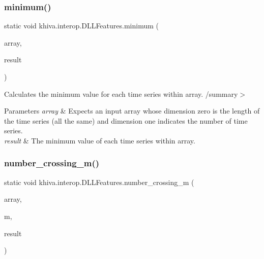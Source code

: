 \subsubsection{\texorpdfstring{minimum()}{minimum()}}
{\footnotesize\ttfamily static void khiva.\+interop.\+D\+L\+L\+Features.\+minimum (\begin{DoxyParamCaption}\item[{\mbox{[}\+In\mbox{]} ref Int\+Ptr}]{array,  }\item[{\mbox{[}\+Out\mbox{]} out Int\+Ptr}]{result }\end{DoxyParamCaption})\hspace{0.3cm}{\ttfamily [static]}}



Calculates the minimum value for each time series within array. /summary$>$ 
\begin{DoxyParams}{Parameters}
{\em array} & Expects an input array whose dimension zero is the length of the time series (all the same) and dimension one indicates the number of time series.\\
\hline
{\em result} & The minimum value of each time series within array.\\
\hline
\end{DoxyParams}


\mbox{\label{classkhiva_1_1interop_1_1_d_l_l_features_abdfebe8a203d23b22848cd2a8e4f033d}} 
\subsubsection{\texorpdfstring{number\+\_\+crossing\+\_\+m()}{number\_crossing\_m()}}
{\footnotesize\ttfamily static void khiva.\+interop.\+D\+L\+L\+Features.\+number\+\_\+crossing\+\_\+m (\begin{DoxyParamCaption}\item[{\mbox{[}\+In\mbox{]} ref Int\+Ptr}]{array,  }\item[{\mbox{[}\+In\mbox{]} ref int}]{m,  }\item[{\mbox{[}\+Out\mbox{]} out Int\+Ptr}]{result }\end{DoxyParamCaption})\hspace{0.3cm}{\ttfamily [static]}}



